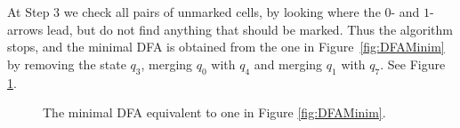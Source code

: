 \begin{exl}
At Step 3 we check all pairs of unmarked cells, by looking where the $0$- and $1$-arrows lead, but do not find anything that should be marked.
Thus the algorithm stops, and the minimal DFA is obtained from the one in Figure~\ref{fig:DFAMinim} by removing the state $q_3$,
merging $q_0$ with $q_4$ and merging $q_1$ with $q_7$. See Figure \ref{fig:DFAMinimResult}.

\begin{figure}[ht]
\begin{center}

\end{center}
\caption{The minimal DFA equivalent to one in Figure \ref{fig:DFAMinim}.}
\label{fig:DFAMinimResult}
\end{figure}
\end{exl}